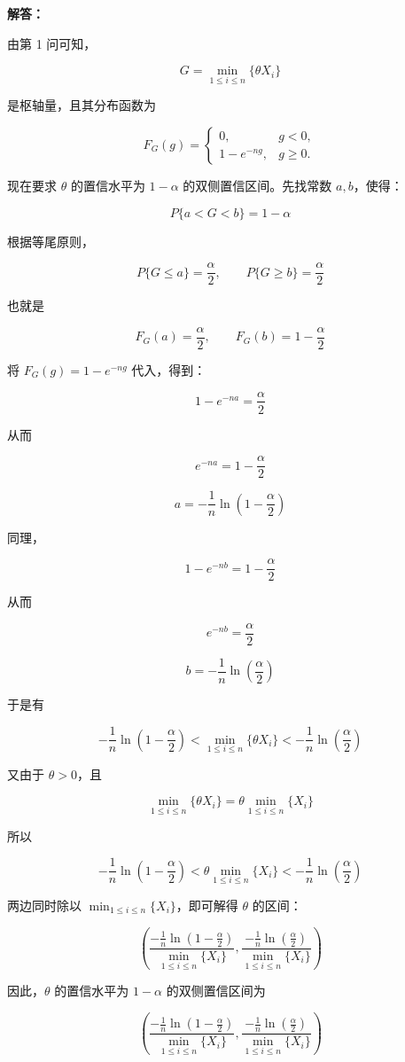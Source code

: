 \documentclass[12pt,a4paper]{article}
\begin{document}
\begin{answerbox}
\textbf{解答：}

由第 1 问可知，

$$
G=\min_{1\leq i\leq n}\{\theta X_i\}
$$

是枢轴量，且其分布函数为

$$
F_G(g)=
\left\{
\begin{array}{ll}
0, & g<0,\\
1-e^{-ng}, & g\ge 0.
\end{array}
\right.
$$

现在要求 $\theta$ 的置信水平为 $1-\alpha$ 的双侧置信区间。先找常数 $a,b$，使得：

$$
P\{a < G < b\} = 1 - \alpha
$$

根据等尾原则，

$$
P\{G\le a\}=\frac{\alpha}{2},\qquad P\{G\ge b\}=\frac{\alpha}{2}
$$

也就是

$$
F_G(a)=\frac{\alpha}{2},\qquad F_G(b)=1-\frac{\alpha}{2}
$$

将 $F_G(g)=1-e^{-ng}$ 代入，得到：

$$
1-e^{-na}=\frac{\alpha}{2}
$$

从而

$$
e^{-na}=1-\frac{\alpha}{2}
$$

$$
a=-\frac{1}{n}\ln\left(1-\frac{\alpha}{2}\right)
$$

同理，

$$
1-e^{-nb}=1-\frac{\alpha}{2}
$$

从而

$$
e^{-nb}=\frac{\alpha}{2}
$$

$$
b=-\frac{1}{n}\ln\left(\frac{\alpha}{2}\right)
$$

于是有

$$
-\frac{1}{n}\ln\left(1-\frac{\alpha}{2}\right) < \min_{1\leq i\leq n}\{\theta X_i\} < -\frac{1}{n}\ln\left(\frac{\alpha}{2}\right)
$$

又由于 $\theta>0$，且

$$
\min_{1\leq i\leq n}\{\theta X_i\} = \theta \min_{1\leq i\leq n}\{X_i\}
$$

所以

$$
-\frac{1}{n}\ln\left(1-\frac{\alpha}{2}\right)
<
\theta \min_{1\leq i\leq n}\{X_i\}
<
-\frac{1}{n}\ln\left(\frac{\alpha}{2}\right)
$$

两边同时除以 $\min_{1\leq i\leq n}\{X_i\}$，即可解得 $\theta$ 的区间：

$$
\left(\frac{-\frac{1}{n}\ln\left(1-\frac{\alpha}{2}\right)}{\min_{1\leq i\leq n}\{X_i\}}, \frac{-\frac{1}{n}\ln\left(\frac{\alpha}{2}\right)}{\min_{1\leq i\leq n}\{X_i\}}\right)
$$

因此，$\theta$ 的置信水平为 $1-\alpha$ 的双侧置信区间为

$$
\left(\frac{-\frac{1}{n}\ln\left(1-\frac{\alpha}{2}\right)}{\min_{1\leq i\leq n}\{X_i\}}, \frac{-\frac{1}{n}\ln\left(\frac{\alpha}{2}\right)}{\min_{1\leq i\leq n}\{X_i\}}\right)
$$

\end{answerbox}
\end{document}

